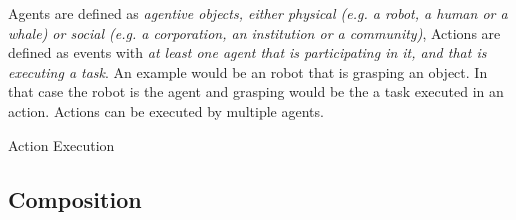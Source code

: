 Agents are defined as \emph{agentive objects, either physical (e.g. a robot, a human or a whale) or social (e.g. a corporation, an institution or a community)}, Actions are defined as events with \emph{at least one agent that is participating in it, and that is executing a task}. An example would be an robot that is grasping an object. In that case the robot is the agent and grasping would be the a task executed in an action. Actions can be executed by multiple agents. 

\begin{ODP}{Action Execution}
\end{ODP}

\subsection{Composition}
\label{sec:composition}


